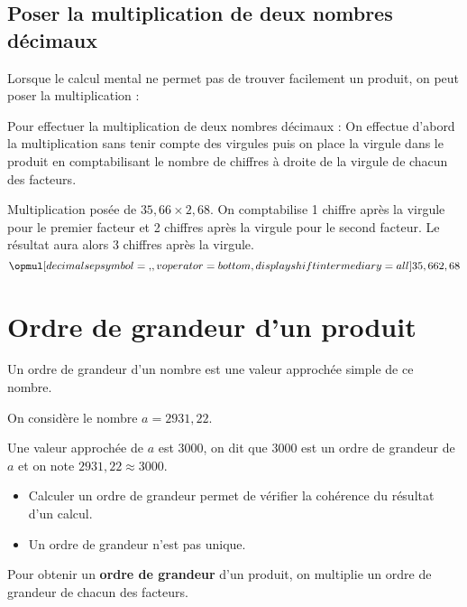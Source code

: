 \begin{pageCours}
\subsection{Poser la multiplication de deux nombres décimaux}

\begin{Mt}
Lorsque le calcul mental ne permet pas de trouver facilement un produit, on peut poser la multiplication :

Pour effectuer la multiplication de deux nombres décimaux : On effectue d'abord la multiplication sans tenir compte des virgules puis on place la virgule dans le produit en comptabilisant le nombre de chiffres à droite de la virgule de chacun des facteurs.
\end{Mt}

\begin{Ex}
Multiplication posée de $35,66\times2,68$. On comptabilise 1 chiffre après la virgule pour le premier facteur et 2 chiffres après la virgule pour le second facteur. Le résultat aura alors 3 chiffres après la virgule.
\[\opmul[decimalsepsymbol={,},
voperator=bottom,
displayshiftintermediary=all]{35,66}{2,68}\]
\end{Ex} 

\section{Ordre de grandeur d'un produit}

\begin{Def}
Un ordre de grandeur d'un nombre est une valeur approchée simple de ce nombre.
\end{Def}

\begin{Ex}
On considère le nombre $a=2931,22$.

Une valeur approchée de $a$ est $3000$, on dit que $3000$ est un ordre de grandeur de $a$ et on note $2931,22\approx3000$.
\end{Ex}

\begin{Rq}
\begin{itemize}
\item  Calculer un ordre de grandeur permet de vérifier la cohérence du résultat d'un calcul.
\item Un ordre de grandeur n'est pas unique.
\end{itemize}
\end{Rq}

\begin{Reg}
Pour obtenir un \textbf{ordre de grandeur} d'un produit, on multiplie un ordre de grandeur de chacun des facteurs.
\end{Reg} 


\end{pageCours}
